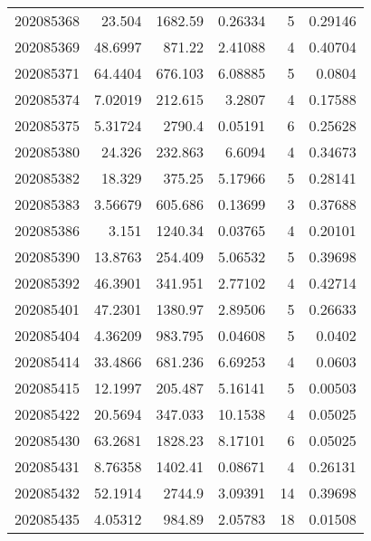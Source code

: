 \begin{tabular}{rrrrrr}
 202085368 &         23.504   &     1682.59   &            0.26334 &           5 & 0.29146 \\
 202085369 &         48.6997  &      871.22   &            2.41088 &           4 & 0.40704 \\
 202085371 &         64.4404  &      676.103  &            6.08885 &           5 & 0.0804  \\
 202085374 &          7.02019 &      212.615  &            3.2807  &           4 & 0.17588 \\
 202085375 &          5.31724 &     2790.4    &            0.05191 &           6 & 0.25628 \\
 202085380 &         24.326   &      232.863  &            6.6094  &           4 & 0.34673 \\
 202085382 &         18.329   &      375.25   &            5.17966 &           5 & 0.28141 \\
 202085383 &          3.56679 &      605.686  &            0.13699 &           3 & 0.37688 \\
 202085386 &          3.151   &     1240.34   &            0.03765 &           4 & 0.20101 \\
 202085390 &         13.8763  &      254.409  &            5.06532 &           5 & 0.39698 \\
 202085392 &         46.3901  &      341.951  &            2.77102 &           4 & 0.42714 \\
 202085401 &         47.2301  &     1380.97   &            2.89506 &           5 & 0.26633 \\
 202085404 &          4.36209 &      983.795  &            0.04608 &           5 & 0.0402  \\
 202085414 &         33.4866  &      681.236  &            6.69253 &           4 & 0.0603  \\
 202085415 &         12.1997  &      205.487  &            5.16141 &           5 & 0.00503 \\
 202085422 &         20.5694  &      347.033  &           10.1538  &           4 & 0.05025 \\
 202085430 &         63.2681  &     1828.23   &            8.17101 &           6 & 0.05025 \\
 202085431 &          8.76358 &     1402.41   &            0.08671 &           4 & 0.26131 \\
 202085432 &         52.1914  &     2744.9    &            3.09391 &          14 & 0.39698 \\
 202085435 &          4.05312 &      984.89   &            2.05783 &          18 & 0.01508 \\

\end{tabular}
